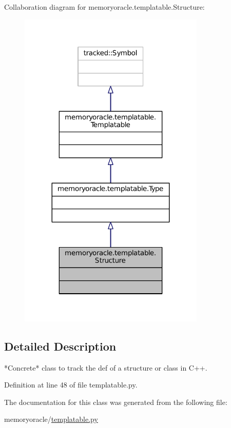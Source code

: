 Collaboration diagram for memoryoracle.\+templatable.\+Structure\+:\nopagebreak
\begin{figure}[H]
\begin{center}
\leavevmode
\includegraphics[width=251pt]{classmemoryoracle_1_1templatable_1_1Structure__coll__graph}
\end{center}
\end{figure}


\subsection{Detailed Description}
\begin{DoxyVerb}*Concrete* class to track the def of a structure or class in C++.
\end{DoxyVerb}
 

Definition at line 48 of file templatable.\+py.



The documentation for this class was generated from the following file\+:\begin{DoxyCompactItemize}
\item 
memoryoracle/\hyperlink{templatable_8py}{templatable.\+py}\end{DoxyCompactItemize}
